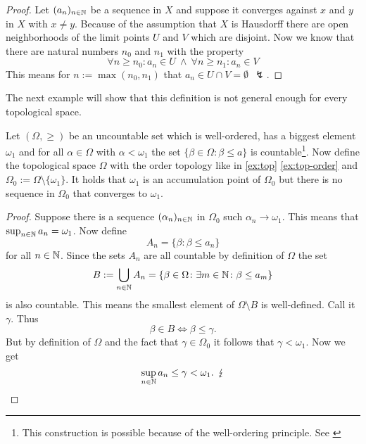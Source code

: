 \begin{proof}
  Let $(a_n)_{n \in \mathbb{N}}$ be a sequence in $X$ and suppose it converges against $x$ and $y$ in $X$ with $x \neq y$. 
  Because of the assumption that $X$ is Hausdorff there are open neighborhoods of the limit points $U$ and $V$ which are disjoint. 
  Now we know that there are natural numbers $n_0$ and $n_1$ with the property
  \begin{equation*}
    \forall n \geq n_0\colon a_n \in U \: \land \: \forall n \geq n_1\colon a_n \in V
  \end{equation*}
  This means for $n := \max(n_0, n_1)$ that $a_n \in U \cap V = \emptyset \:\: \lightning$.
\end{proof}

The next example will show that this definition is not general enough for every topological space.

\begin{ex}\label{ex:ordertop-uncount}
  Let $(\Omega, \geq)$ be an uncountable set which is well-ordered, has a biggest element $\omega_1$ and for all $\alpha \in \Omega$ with $\alpha < \omega_1$ the set $\{\beta \in \Omega\colon \beta \leq a\}$ is countable\footnote{This construction is possible because of the well-ordering principle. See \cite[p. 53]{BvQMT}}.
  Now define the topological space $\Omega$ with the order topology like in \ref{ex:top} \ref{ex:top-order} and $\Omega_0 := \Omega\setminus \{\omega_1\}$.
  It holds that $\omega_1$ is an accumulation point of $\Omega_0$ but there is no sequence in $\Omega_0$ that converges to $\omega_1$.
\end{ex}

\begin{proof}
  Suppose there is a sequence $(\alpha_n)_{n\in\mathbb{N}}$ in $\Omega_0$ such $\alpha_n \to \omega_1$. This means that $\sup_{n\in\mathbb{N}} a_n = \omega_1$. Now define
  \begin{equation*}
    A_n = \{\beta\colon \beta \leq a_n\}
  \end{equation*}
  for all $n \in \mathbb{N}$. Since the sets $A_n$ are all countable by definition of $\Omega$ the set
  \begin{equation*}
    B := \bigcup\limits_{n\in\mathbb{N}} A_n = \{\beta \in \Omega\colon \exists m\in\mathbb{N} \colon \beta \leq a_m \}
  \end{equation*}
  is also countable. This means the smallest element of $\Omega\setminus B$ is well-defined. Call it $\gamma$. Thus
  \begin{equation*}
    \beta \in B \iff \beta \leq \gamma. 
  \end{equation*}
  But by definition of $\Omega$ and the fact that $\gamma \in \Omega_0$ it follows that $\gamma < \omega_1$. Now we get
  \begin{equation*}
    \sup\limits_{n\in\mathbb{N}} a_n \leq \gamma < \omega_1. \:\: \lightning \qedhere
  \end{equation*}
\end{proof}


